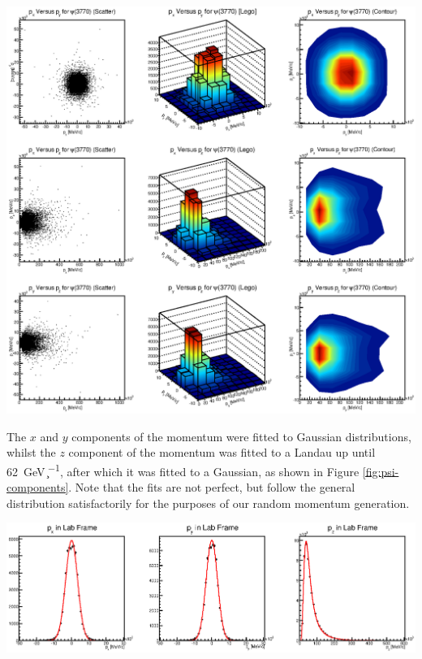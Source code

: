 

\begin{center}
    \includegraphics[width=\linewidth]{graphs/PsiMomentumComponentCorrelation.eps}
    \label{fig:psi-correlation-graphs}
\end{center}

The $x$ and $y$ components of the momentum were fitted to Gaussian
distributions, whilst the $z$ component of the momentum was fitted to a Landau
up until \SI{62}{\giga\electronvolt\per\c}, after which it was fitted to a
Gaussian, as shown in Figure \ref{fig:psi-components}. Note that the fits are
not perfect, but follow the general distribution satisfactorily for the purposes
of our random momentum generation.

\begin{center}
    \includegraphics[width=\linewidth]{graphs/PsiMomentumComponentFit.eps}
    \label{fig:psi-components}
\end{center}

